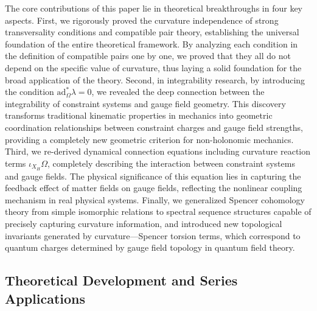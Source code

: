 \documentclass[a4paper,12pt]{extarticle}
\theoremstyle{definition}
\begin{document}
The core contributions of this paper lie in theoretical breakthroughs in four key aspects. First, we rigorously proved the curvature independence of strong transversality conditions and compatible pair theory, establishing the universal foundation of the entire theoretical framework. By analyzing each condition in the definition of compatible pairs one by one, we proved that they all do not depend on the specific value of curvature, thus laying a solid foundation for the broad application of the theory. Second, in integrability research, by introducing the condition $\text{ad}_\Omega^* \lambda = 0$, we revealed the deep connection between the integrability of constraint systems and gauge field geometry. This discovery transforms traditional kinematic properties in mechanics into geometric coordination relationships between constraint charges and gauge field strengths, providing a completely new geometric criterion for non-holonomic mechanics. Third, we re-derived dynamical connection equations including curvature reaction terms $\iota_{X_H} \Omega$, completely describing the interaction between constraint systems and gauge fields. The physical significance of this equation lies in capturing the feedback effect of matter fields on gauge fields, reflecting the nonlinear coupling mechanism in real physical systems. Finally, we generalized Spencer cohomology theory from simple isomorphic relations to spectral sequence structures capable of precisely capturing curvature information, and introduced new topological invariants generated by curvature—Spencer torsion terms, which correspond to quantum charges determined by gauge field topology in quantum field theory.

\subsection{Theoretical Development and Series Applications}
\end{document}
